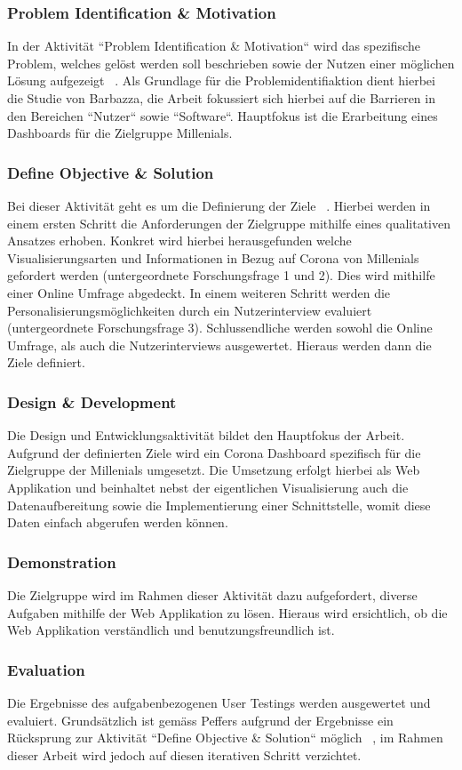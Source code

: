 \subsubsection{Problem Identification \& Motivation}
In der Aktivität ``Problem Identification \& Motivation`` wird das spezifische Problem, welches gelöst werden soll beschrieben sowie der Nutzen einer möglichen Lösung aufgezeigt ~\citep[S. 52]{peffers}. Als Grundlage für die Problemidentifiaktion dient hierbei die Studie von Barbazza, die Arbeit fokussiert sich hierbei auf die Barrieren in den Bereichen ``Nutzer`` sowie ``Software``. Hauptfokus ist die Erarbeitung eines Dashboards für die Zielgruppe Millenials.

\subsubsection{Define Objective \& Solution}
Bei dieser Aktivität geht es um die Definierung der Ziele ~\citep[S. 52]{peffers}. Hierbei werden in einem ersten Schritt die Anforderungen der Zielgruppe mithilfe eines qualitativen Ansatzes erhoben. Konkret wird hierbei herausgefunden welche Visualisierungsarten und Informationen in Bezug auf Corona von Millenials gefordert werden (untergeordnete Forschungsfrage 1 und 2). Dies wird mithilfe einer Online Umfrage abgedeckt. In einem weiteren Schritt werden die Personalisierungsmöglichkeiten durch ein Nutzerinterview evaluiert (untergeordnete Forschungsfrage 3). Schlussendliche werden sowohl die Online Umfrage, als auch die Nutzerinterviews ausgewertet. Hieraus werden dann die Ziele definiert.

\subsubsection{Design \& Development}
Die Design und Entwicklungsaktivität bildet den Hauptfokus der Arbeit. Aufgrund der definierten Ziele wird ein Corona Dashboard spezifisch für die Zielgruppe der Millenials umgesetzt. Die Umsetzung erfolgt hierbei als Web Applikation und beinhaltet nebst der eigentlichen Visualisierung auch die Datenaufbereitung sowie die Implementierung einer Schnittstelle, womit diese Daten einfach abgerufen werden können.

\subsubsection{Demonstration}
Die Zielgruppe wird im Rahmen dieser Aktivität dazu aufgefordert, diverse Aufgaben mithilfe der Web Applikation zu lösen. Hieraus wird ersichtlich, ob die Web Applikation verständlich und benutzungsfreundlich ist.

\subsubsection{Evaluation}
Die Ergebnisse des aufgabenbezogenen User Testings werden ausgewertet und evaluiert. Grundsätzlich ist gemäss Peffers aufgrund der Ergebnisse ein Rücksprung zur Aktivität ``Define Objective \& Solution`` möglich ~\citep[S. 56]{peffers}, im Rahmen dieser Arbeit wird jedoch auf diesen iterativen Schritt verzichtet.